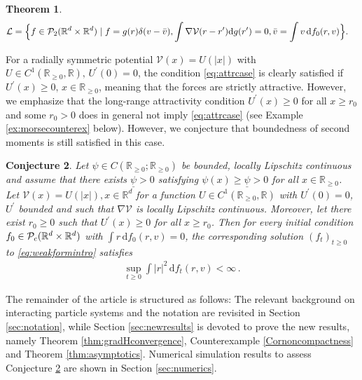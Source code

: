 \documentclass[11pt]{article}
\newtheorem{theorem}{Theorem}[section]
\newtheorem{conjecture}[theorem]{Conjecture}
\newcommand{\R}[0]{\mathbb R}
\newcommand{\abs}[1]{\left| #1 \right|}
\newcommand{\Pp}[1]{
    \ifx #1\infty
        \mathcal{P}_{c}
    \else 
        \mathcal{P}_{#1}
    \fi 
}
\newcommand{\msolinit}[1]{f_0(#1)}
\newcommand{\msolt}[2]{f_{#1}(#2)}
\begin{document}
\begin{bibunit}[unsrtnat]
\begin{theorem}
\begin{align*}
            \mathcal L &= \Big\{ f \in \Pp{2}(\R^d \times \R^d) \mid f=g(r) \delta(v-\bar{v} ), \int \nabla \mathcal{V}(r -r^\prime) \mathrm{d} g(r^\prime) = 0,  \bar{v} = \int  v \,  \mathrm{d} \msolinit{r,v} \Big\}. 
        \end{align*}
    \end{theorem}
    For a radially symmetric potential $\mathcal{V}(x) = U (\abs{x})$ with $U \in C^1(\R_{\geq 0}, \R), \, U^\prime(0) = 0$, the condition \eqref{eq:attrcase} is clearly satisfied if $U^\prime(x) \geq 0 , \, x \in \R_{\geq 0}$, meaning that the forces are strictly attractive. However, we emphasize that the long-range attractivity condition $U^\prime(x) \geq 0$ for all $x \geq r_0$ and some $r_0 > 0$ does in general not imply \eqref{eq:attrcase} (see Example \ref{ex:morsecounterex} below). However, we conjecture that boundedness of second moments is still satisfied in this case. 
\begin{conjecture}\label{con:boundedness}
   Let $\psi \in C(\R_{\geq 0}; \R_{\geq 0})$ be bounded, locally Lipschitz continuous and assume that there exists $\underline{\psi} > 0$ satisfying $\psi(x) \geq \underline{\psi} > 0$ for all $x \in \R_{\geq 0}$. Let $\mathcal{V}(x)  = U(\abs{x}), x \in \R^d $ for a function $U \in C^1(\R_{\geq 0}, \R)$ with $U^\prime (0) = 0$, $U^\prime$ bounded and such that $\nabla \mathcal{V}$ is locally Lipschitz continuous. Moreover, let there exist $r_0 \geq 0$ such that $U^\prime(x) \geq 0$ for all $x \geq r_0$. Then for every initial condition $f_0 \in \Pp{\infty}(\R^d \times \R^d)$ with $\int r \, \mathrm{d} \msolinit{r,v} = 0$, the corresponding solution $(f_t)_{t \geq 0}$ to \eqref{eq:weakformintro} satisfies 
    \begin{align*}
        \sup_{t \geq 0} \int \abs{r}^2 \, \mathrm{d}\msolt{t}{r,v} < \infty \, .
    \end{align*}
\end{conjecture}
The remainder of the article is structured as follows: The relevant background on interacting particle systems and the notation are revisited in Section \ref{sec:notation}, while Section \ref{sec:newresults} is devoted to prove the new results, namely Theorem \ref{thm:gradHconvergence}, Counterexample \ref{Cornoncompactness} and Theorem \ref{thm:asymptotics}. Numerical simulation results to assess Conjecture \ref{con:boundedness} are shown in Section \ref{sec:numerics}.


\end{bibunit}
\end{document}
